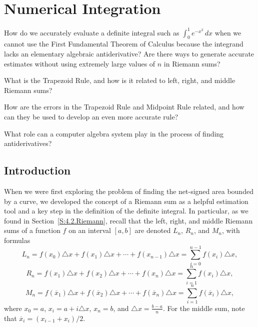 \section{Numerical Integration} \label{S:5.6.NumInt}

\begin{goals}
\item How do we accurately evaluate a definite integral such as $\int_0^1 e^{-x^2} \, dx$ when we cannot use the First Fundamental Theorem of Calculus because the integrand lacks an elementary algebraic antiderivative?  Are there ways to generate accurate estimates without using extremely large values of $n$ in Riemann sums?
\item What is the Trapezoid Rule, and how is it related to left, right, and middle Riemann sums?
\item How are the errors in the Trapezoid Rule and Midpoint Rule related, and how can they be used to develop an even more accurate rule?
\item What role can a computer algebra system play in the process of finding antiderivatives?
\end{goals}

\subsection*{Introduction}

When we were first exploring the problem of finding the net-signed area bounded by a curve, we developed the concept of a Riemann sum as a helpful estimation tool and a key step in the definition of the definite integral.  In particular, as we found in Section~\ref{S:4.2.Riemann}, recall that the left, right, and middle Riemann sums of a function $f$ on an interval $[a,b]$ are denoted $L_n$, $R_n$, and $M_n$, with formulas\small
\begin{equation} \label{E:Left}
L_n = f(x_0) \triangle x + f(x_1) \triangle x + \cdots + f(x_{n-1}) \triangle x = \sum_{i = 0}^{n-1} f(x_i) \triangle x,
\end{equation}
\begin{equation} \label{E:Left}R_n = f(x_1) \triangle x + f(x_2) \triangle x + \cdots + f(x_{n}) \triangle x = \sum_{i = 1}^{n} f(x_i) \triangle x,
\end{equation}
\begin{equation} \label{E:Left}M_n = f(\overline{x}_1) \triangle x + f(\overline{x}_2) \triangle x + \cdots + f(\overline{x}_{n}) \triangle x = \sum_{i = 1}^{n} f(\overline{x}_i) \triangle x,
\end{equation}\normalsize
where $x_0 = a$, $x_i = a + i\triangle x$, $x_n = b$, and $\triangle x = \frac{b-a}{n}$.  For the middle sum, note that $\overline{x}_{i} = (x_{i-1} + x_i)/2$.  

